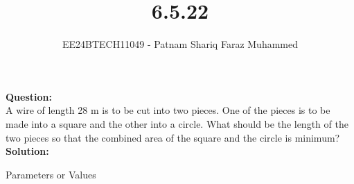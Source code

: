 \documentclass[journal]{IEEEtran}
\numberwithin{equation}{enumi}
\numberwithin{figure}{enumi}
\begin{document}


\title{6.5.22}
\author{EE24BTECH11049 - Patnam Shariq Faraz Muhammed}

{\let\newpage\relax\maketitle}

\textbf{Question:}\\
A wire of length 28 m is to be cut into two pieces. One of the pieces is to be made into a square and the other into a circle. What should be the length of the two pieces so that the combined area of the square and the circle is minimum?\\
\textbf{Solution:}\\
\begin{table}[!ht]
    \centering
    
    \caption{Parameters or Values}
    \label{tab:my_label}
\end{table}
\end{document}
